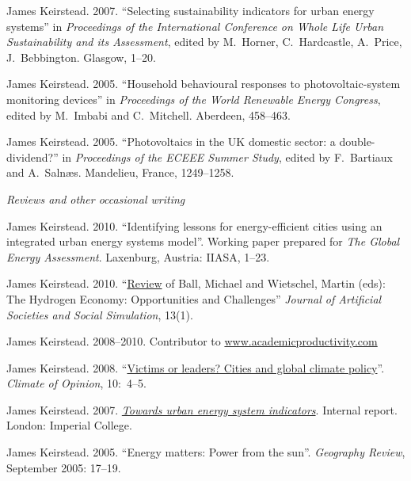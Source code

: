 \documentclass[11pt,a4paper]{article}
\begin{document}
\ind James Keirstead. 2007. ``Selecting sustainability indicators for urban energy systems'' in \emph{Proceedings of the International Conference on Whole Life Urban Sustainability and its Assessment}, edited by M.\ Horner, C.\ 
Hardcastle, A.\ Price, J.\ Bebbington. Glasgow, 1--20.

\ind James Keirstead. 2005. ``Household behavioural responses to photovoltaic-system monitoring devices'' in \emph{Proceedings of the World Renewable Energy Congress}, edited by M.\ Imbabi and C.\ Mitchell. Aberdeen, 458--463.

\ind James Keirstead. 2005. ``Photovoltaics in the UK domestic sector: a double-dividend?'' in \emph{Proceedings of the ECEEE Summer Study}, edited by F.\ Bartiaux and A.\ Saln{\ae}s. Mandelieu, France, 1249--1258.

\bigskip
 
\noindent\emph{Reviews and other occasional writing \vspace{0.05in}}


\ind James Keirstead. 2010. ``Identifying lessons for energy-efficient cities using an integrated urban energy systems model''.  Working paper prepared for \emph{The Global Energy Assessment}.  Laxenburg, Austria: IIASA, 1--23.

\ind James Keirstead. 2010. ``\href{http://jasss.soc.surrey.ac.uk/13/1/reviews/keirstead.html}{Review} of Ball, Michael and Wietschel, Martin (eds): The Hydrogen Economy: Opportunities and Challenges'' \emph{Journal of Artificial Societies and Social Simulation}, 13(1).

\ind James Keirstead. 2008--2010.  Contributor to \href{http://www.academicproductivity.com}{www.academicproductivity.com}

\ind James Keirstead. 2008. ``\href{http://www.stockholm-network.org/downloads/publications/Climate_of_Opinion_10.pdf}{Victims or leaders? Cities and global climate policy}''. \emph{Climate of Opinion}, 10:~4--5.

\ind James Keirstead. 2007.  \href{http://www3.imperial.ac.uk/pls/portallive/docs/1/24897696.PDF}{\emph{Towards urban energy system indicators}}.  Internal report. London: Imperial College.

\ind James Keirstead. 2005. ``Energy matters: Power from the sun''.  \emph{Geography Review}, September 2005: 17--19.
\end{document}
